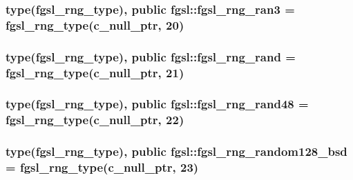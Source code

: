 \subsubsection[{fgsl\+\_\+rng\+\_\+ran3}]{\setlength{\rightskip}{0pt plus 5cm}type({\bf fgsl\+\_\+rng\+\_\+type}), public fgsl\+::fgsl\+\_\+rng\+\_\+ran3 = {\bf fgsl\+\_\+rng\+\_\+type}(c\+\_\+null\+\_\+ptr, 20)}\label{namespacefgsl_a2bcafc9c66a493e0ad7ead60bf9d9a0e}
\hypertarget{namespacefgsl_afbedce588830713e9a4f2dfdebe1a262}{}
\subsubsection[{fgsl\+\_\+rng\+\_\+rand}]{\setlength{\rightskip}{0pt plus 5cm}type({\bf fgsl\+\_\+rng\+\_\+type}), public fgsl\+::fgsl\+\_\+rng\+\_\+rand = {\bf fgsl\+\_\+rng\+\_\+type}(c\+\_\+null\+\_\+ptr, 21)}\label{namespacefgsl_afbedce588830713e9a4f2dfdebe1a262}
\hypertarget{namespacefgsl_ae82ea40ab1281a4f6390dc0fd2ba998b}{}
\subsubsection[{fgsl\+\_\+rng\+\_\+rand48}]{\setlength{\rightskip}{0pt plus 5cm}type({\bf fgsl\+\_\+rng\+\_\+type}), public fgsl\+::fgsl\+\_\+rng\+\_\+rand48 = {\bf fgsl\+\_\+rng\+\_\+type}(c\+\_\+null\+\_\+ptr, 22)}\label{namespacefgsl_ae82ea40ab1281a4f6390dc0fd2ba998b}
\hypertarget{namespacefgsl_a398996158c507375c9f2d554deb5d27b}{}
\subsubsection[{fgsl\+\_\+rng\+\_\+random128\+\_\+bsd}]{\setlength{\rightskip}{0pt plus 5cm}type({\bf fgsl\+\_\+rng\+\_\+type}), public fgsl\+::fgsl\+\_\+rng\+\_\+random128\+\_\+bsd = {\bf fgsl\+\_\+rng\+\_\+type}(c\+\_\+null\+\_\+ptr, 23)}\label{namespacefgsl_a398996158c507375c9f2d554deb5d27b}
\hypertarget{namespacefgsl_aa3d875270ff8191378a356c1b7aadc43}{}
